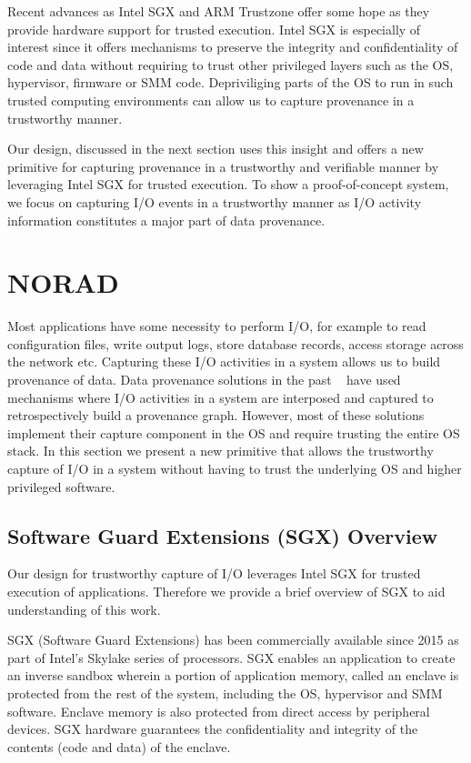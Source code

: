 \documentclass[withindex,glossary]{cam-thesis}
\begin{document}
Recent advances as Intel SGX and ARM Trustzone offer some hope as they provide hardware support for trusted execution.
Intel SGX is especially of interest since it offers mechanisms to preserve the integrity and confidentiality of code and data without requiring to trust other privileged layers such as the OS, hypervisor, firmware or SMM code.
Depriviliging parts of the OS to run in such trusted computing environments can allow us to capture provenance in a trustworthy manner.

Our design, discussed in the next section uses this insight and offers a new primitive for capturing provenance in a trustworthy and verifiable manner by leveraging Intel SGX for trusted execution.
To show a proof-of-concept system, we focus on capturing I/O events in a trustworthy manner as I/O activity information constitutes a major part of data provenance.


\section{NORAD}

Most applications have some necessity to perform I/O, for example to read configuration files, write output logs, store database records, access storage across the network etc.
Capturing these I/O activities in a system allows us to build provenance of data.
Data provenance solutions in the past ~\cite{PASS, StoryBook} have used mechanisms where I/O activities in a system are interposed and captured to retrospectively build a provenance graph.
However, most of these solutions implement their capture component in the OS and require trusting the entire OS stack.
In this section we present a new primitive that allows the trustworthy capture of I/O in a system without having to trust the underlying OS and higher privileged software.

\subsection{Software Guard Extensions (SGX) Overview}
Our design for trustworthy capture of I/O leverages Intel SGX for trusted execution of applications.
Therefore we provide a brief overview of SGX to aid understanding of this work.

SGX (Software Guard Extensions) has been commercially available since 2015 as part of Intel’s Skylake series of processors.
SGX enables an application to create an inverse sandbox wherein a portion of application memory, called an enclave is protected from the rest of the system, including the OS, hypervisor and SMM software.
Enclave memory is also protected from direct access by peripheral devices.
SGX hardware guarantees the confidentiality and integrity of the contents (code and data) of the enclave.
\end{document}

